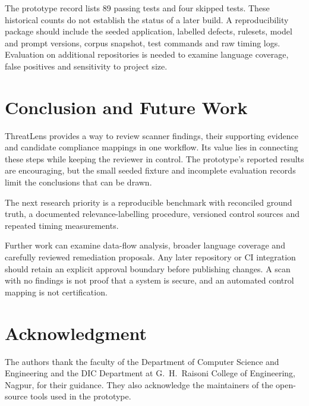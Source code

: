\documentclass[conference,letterpaper]{IEEEtran}
\begin{document}
The prototype record lists 89 passing tests and four skipped tests. These historical counts do not establish the status of a later build. A reproducibility package should include the seeded application, labelled defects, rulesets, model and prompt versions, corpus snapshot, test commands and raw timing logs. Evaluation on additional repositories is needed to examine language coverage, false positives and sensitivity to project size.

\section{Conclusion and Future Work}
ThreatLens provides a way to review scanner findings, their supporting evidence and candidate compliance mappings in one workflow. Its value lies in connecting these steps while keeping the reviewer in control. The prototype's reported results are encouraging, but the small seeded fixture and incomplete evaluation records limit the conclusions that can be drawn.

The next research priority is a reproducible benchmark with reconciled ground truth, a documented relevance-labelling procedure, versioned control sources and repeated timing measurements.

\newpage
Further work can examine data-flow analysis, broader language coverage and carefully reviewed remediation proposals. Any later repository or CI integration should retain an explicit approval boundary before publishing changes. A scan with no findings is not proof that a system is secure, and an automated control mapping is not certification.

\section*{Acknowledgment}
The authors thank the faculty of the Department of Computer Science and Engineering and the DIC Department at G.~H.~Raisoni College of Engineering, Nagpur, for their guidance. They also acknowledge the maintainers of the open-source tools used in the prototype.
\end{document}

